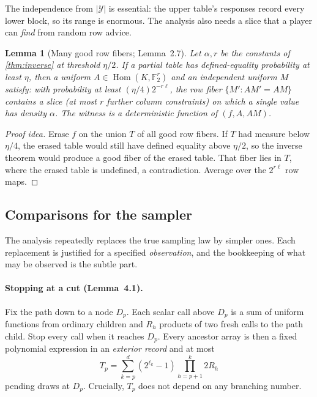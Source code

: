 \documentclass[11pt]{article}
\newtheorem{lemma}[theorem]{Lemma}
\theoremstyle{definition}
\theoremstyle{remark}
\DeclareMathOperator{\Hom}{Hom}
\newcommand{\Fb}{\mathbb F_2}
\begin{document}
The independence from $|\mathcal Y|$ is essential: the upper table's
responses record every lower block, so its range is enormous. The analysis
also needs a slice that a player can \emph{find} from random row advice.

\begin{lemma}[Many good row fibers; Lemma~2.7]\label{lem:many-fibers}
Let $\alpha,r$ be the constants of \cref{thm:inverse} at threshold $\eta/2$.
If a partial table has defined-equality probability at least $\eta$, then a
uniform
$A\in\Hom(K,\Fb^r)$ and an independent uniform $M$ satisfy: with probability
at least $(\eta/4)2^{-r\ell}$, the row fiber $\{M':AM'=AM\}$ contains a slice
(at most $r$ further column constraints) on which a single value has density
$\alpha$. The witness is a deterministic function of $(f,A,AM)$.
\end{lemma}

\begin{proof}[Proof idea]
Erase $f$ on the union $T$ of all good row fibers. If $T$ had measure below
$\eta/4$, the erased table would still have defined equality above $\eta/2$,
so the inverse theorem would produce a good fiber of the erased table. That
fiber lies in $T$, where the erased table is undefined, a contradiction.
Average over the $2^{r\ell}$ row maps.
\end{proof}

\subsection{Comparisons for the sampler}\label{sec:comparisons}

The analysis repeatedly replaces the true sampling law by simpler ones. Each
replacement is justified for a specified \emph{observation}, and the
bookkeeping of what may be observed is the subtle part.

\paragraph{Stopping at a cut (Lemma~4.1).} Fix the path down to a node $D_p$.
Each scalar call above $D_p$ is a sum of uniform functions from ordinary
children and $R_h$ products of two fresh calls to the path child. Stop every
call when it reaches $D_p$. Every ancestor array is then a fixed polynomial
expression in an \emph{exterior record} and at most
\[
 T_p=\sum_{k=p}^d(2^{\ell_k}-1)\prod_{h=p+1}^k 2R_h
\]
pending draws at $D_p$. Crucially, $T_p$ does not depend on any branching
number.
\end{document}
